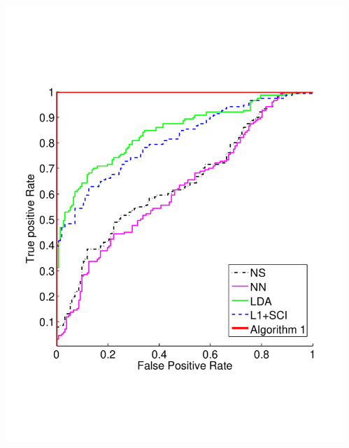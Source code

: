 {\begin{columns}
\begin{column}{.33\textwidth}
\begin{center}
\vspace{-.1in}{\tiny Scarf}
\includegraphics[width=.9\textwidth]{figures_iccv/roc/eYB-60.pdf}\\
\vspace{-.1in}{\tiny 60\% occlusion}
\end{center}
\end{column}
\begin{column}{.33\textwidth}
\begin{center}

\end{center}
\end{column}
\end{columns}}
